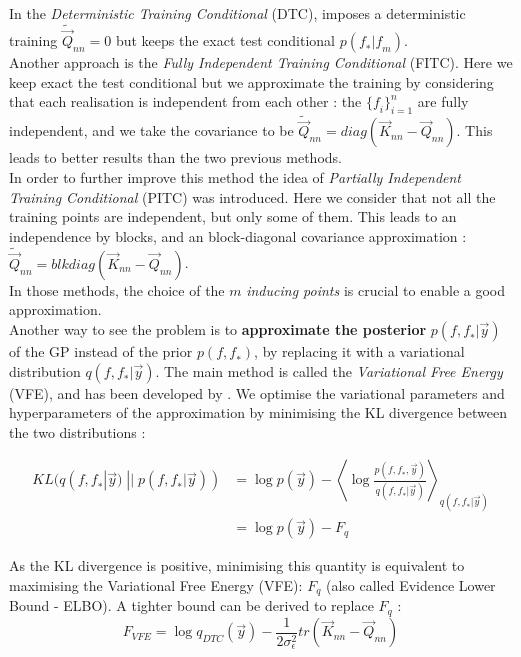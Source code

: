 In the \textit{Deterministic Training Conditional} (DTC), imposes a deterministic training $\tilde{\vec{Q}}_{nn} = 0$ but keeps the exact test conditional $p(\mathit{f}_* | \mathit{f}_m)$.  \\
 
 Another approach is the \textit{Fully Independent Training Conditional} (FITC). Here we keep exact the test conditional but we approximate the training by considering that each realisation is independent from each other : the $\{\mathit{f}_i\}^n_{i=1}$ are fully independent, and we take the covariance to be $\tilde{\vec{Q}}_{nn} = diag(\vec{K}_{nn} - \vec{Q}_{nn} ) $. This leads to better results than the two previous methods. \\
 
 In order to further improve this method the idea of \textit{Partially Independent Training Conditional} (PITC) was introduced. Here we consider that not all the training points are independent, but only some of them. This leads to an independence by blocks, and an block-diagonal covariance approximation : $\tilde{\vec{Q}}_{nn} = blkdiag(\vec{K}_{nn} - \vec{Q}_{nn} ) $. \\ 
 
In those methods, the choice of the $m$ \textit{inducing points} is crucial to enable a good approximation. \\


Another way to see the problem is to \textbf{approximate the posterior} $p(\mathit{f,f_*} | \vec{y})$ of the GP instead of the prior $p(\mathit{f,f_*})$, by replacing it with a variational distribution  $q(\mathit{f,f_*} | \vec{y})$. The main method is called the \textit{Variational Free Energy} (VFE), and has been developed by \cite{titsias_variational_2009}. We optimise the variational parameters and hyperparameters of the  approximation by minimising the KL divergence between the two distributions : 


\begin{align}
    KL(q(\mathit{f,f_*} | \vec{y})\; || \;  p(\mathit{f,f_*} | \vec{y})) &= \log p(\vec{y}) - \left\langle  \log \frac{p(\mathit{f,f_*},\vec{y})}{q(\mathit{f,f_*} | \vec{y})}\right\rangle_{q(\mathit{f,f_*} | \vec{y})} \\
    &= \log p(\vec{y}) - F_q
    \label{equ:vfe_kl}
    \end{align}  
    
As the KL divergence is positive, minimising this quantity is equivalent to maximising the Variational Free Energy (VFE): $F_q$ (also called Evidence Lower Bound - ELBO). A tighter bound can be derived to replace $F_q$ : 
\begin{equation}
    F_{VFE} = \log q_{DTC}(\vec{y}) - \frac{1}{2\sigma_\epsilon^2} tr(\vec{K}_{nn} - \vec{Q}_{nn})
\end{equation}

